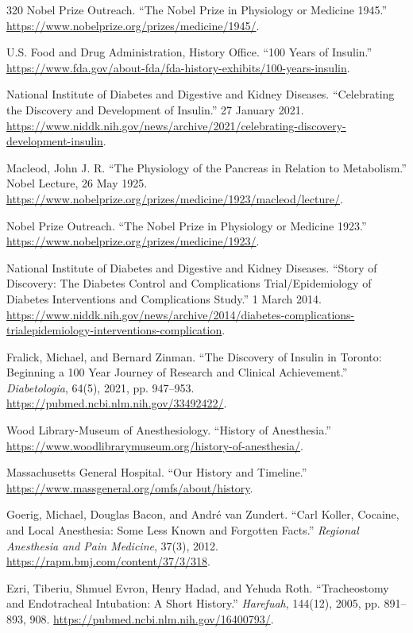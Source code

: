 \documentclass[12pt,oneside]{book}
\begin{document}
\begin{thebibliography}{320}
Nobel Prize Outreach. ``The Nobel Prize in Physiology or Medicine 1945.''
\url{https://www.nobelprize.org/prizes/medicine/1945/}.

U.S. Food and Drug Administration, History Office. ``100 Years of Insulin.''
\url{https://www.fda.gov/about-fda/fda-history-exhibits/100-years-insulin}.

National Institute of Diabetes and Digestive and Kidney Diseases. ``Celebrating
the Discovery and Development of Insulin.'' 27 January 2021.
\url{https://www.niddk.nih.gov/news/archive/2021/celebrating-discovery-development-insulin}.

Macleod, John J. R. ``The Physiology of the Pancreas in Relation to
Metabolism.'' Nobel Lecture, 26 May 1925.
\url{https://www.nobelprize.org/prizes/medicine/1923/macleod/lecture/}.

Nobel Prize Outreach. ``The Nobel Prize in Physiology or Medicine 1923.''
\url{https://www.nobelprize.org/prizes/medicine/1923/}.

National Institute of Diabetes and Digestive and Kidney Diseases. ``Story of
Discovery: The Diabetes Control and Complications Trial/Epidemiology of
Diabetes Interventions and Complications Study.'' 1 March 2014.
\url{https://www.niddk.nih.gov/news/archive/2014/diabetes-complications-trialepidemiology-interventions-complication}.

Fralick, Michael, and Bernard Zinman. ``The Discovery of Insulin in Toronto:
Beginning a 100 Year Journey of Research and Clinical Achievement.''
\emph{Diabetologia}, 64(5), 2021, pp. 947--953.
\url{https://pubmed.ncbi.nlm.nih.gov/33492422/}.

Wood Library-Museum of Anesthesiology. ``History of Anesthesia.''
\url{https://www.woodlibrarymuseum.org/history-of-anesthesia/}.

Massachusetts General Hospital. ``Our History and Timeline.''
\url{https://www.massgeneral.org/omfs/about/history}.

Goerig, Michael, Douglas Bacon, and Andr\'e van Zundert. ``Carl Koller,
Cocaine, and Local Anesthesia: Some Less Known and Forgotten Facts.''
\emph{Regional Anesthesia and Pain Medicine}, 37(3), 2012.
\url{https://rapm.bmj.com/content/37/3/318}.

Ezri, Tiberiu, Shmuel Evron, Henry Hadad, and Yehuda Roth. ``Tracheostomy and
Endotracheal Intubation: A Short History.'' \emph{Harefuah}, 144(12), 2005,
pp. 891--893, 908. \url{https://pubmed.ncbi.nlm.nih.gov/16400793/}.


\end{thebibliography}
\end{document}
